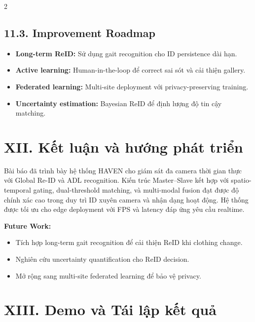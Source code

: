 \documentclass[a4paper,13pt]{article}
\begin{document}
\begin{multicols}{2}
\subsection*{11.3. Improvement Roadmap}
\begin{itemize}
    \item \textbf{Long-term ReID:} Sử dụng gait recognition cho ID persistence dài hạn.
    \item \textbf{Active learning:} Human-in-the-loop để correct sai sót và cải thiện gallery.
    \item \textbf{Federated learning:} Multi-site deployment với privacy-preserving training.
    \item \textbf{Uncertainty estimation:} Bayesian ReID để định lượng độ tin cậy matching.
\end{itemize}

\section*{XII. Kết luận và hướng phát triển}

Bài báo đã trình bày hệ thống HAVEN cho giám sát đa camera thời gian thực với Global Re-ID và ADL recognition. Kiến trúc Master--Slave kết hợp với spatio-temporal gating, dual-threshold matching, và multi-modal fusion đạt được độ chính xác cao trong duy trì ID xuyên camera và nhận dạng hoạt động. Hệ thống được tối ưu cho edge deployment với FPS và latency đáp ứng yêu cầu realtime.

\textbf{Future Work:}
\begin{itemize}
    \item Tích hợp long-term gait recognition để cải thiện ReID khi clothing change.
    \item Nghiên cứu uncertainty quantification cho ReID decision.
    \item Mở rộng sang multi-site federated learning để bảo vệ privacy.
\end{itemize}

\section*{XIII. Demo và Tái lập kết quả}


\end{multicols}
\end{document}
